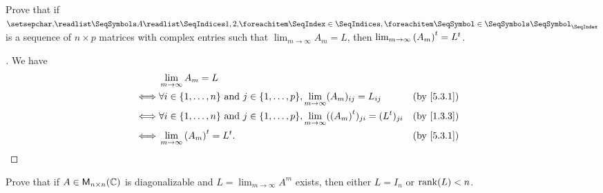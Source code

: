 \exercisesection

\setcounter{ex}{2}
\begin{ex}\label{ex:5.3.3}
	Prove that if \(\seq{A}{1,2,}\) is a sequence of \(n \times p\) matrices with complex entries such that \(\lim_{m \to \infty} A_m = L\), then \(\lim_{m \to \infty} {(A_m)}^{t} = {L}^{t}\).
\end{ex}

\begin{proof}[]
	We have
	\begin{align*}
		     & \lim_{m \to \infty} A_m = L                                                                                                                   \\
		\iff & \forall i \in \set{1, \dots, n} \text{ and } j \in \set{1, \dots, p}, \lim_{m \to \infty} (A_m)_{i j} = L_{i j}               &  & \by{5.3.1} \\
		\iff & \forall i \in \set{1, \dots, n} \text{ and } j \in \set{1, \dots, p}, \lim_{m \to \infty} (\tp{(A_m)})_{j i} = (\tp{L})_{j i} &  & \by{1.3.3} \\
		\iff & \lim_{m \to \infty} \tp{(A_m)} = \tp{L}.                                                                                      &  & \by{5.3.1}
	\end{align*}
\end{proof}

\begin{ex}\label{ex:5.3.4}
	Prove that if \(A \in \mathsf{M}_{{n} \times n}({\mathbb{C}})\) is diagonalizable and \(L = \lim_{m \to \infty} A^m\) exists, then either \(L = I_n\) or \(\rk{L} < n\).
\end{ex}


